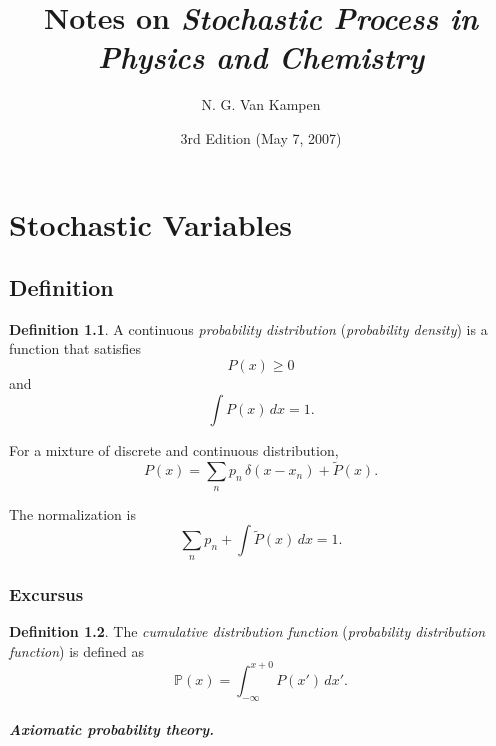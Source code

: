 \documentclass{book}
\numberwithin{equation}{section}
\theoremstyle{plain}
\theoremstyle{definition}
\newtheorem{defn}{Definition}[section]
\theoremstyle{remark}
\begin{document}
\title{Notes on \emph{Stochastic Process in Physics and Chemistry}\cite{vankampen}}
\author{N. G. Van Kampen}
\date{3rd Edition (May 7, 2007)}

\maketitle

\tableofcontents


\chapter{Stochastic Variables}

\section{Definition}

\begin{defn}
  A continuous \emph{probability distribution}
  (\emph{probability density}) is a function
  that satisfies
  \begin{equation}
    P(x) \ge 0
    \label{eq:Px_nonneg}
  \end{equation}
  and
  \begin{equation}
    \int P(x) \, dx = 1.
    \label{eq:Px_normalize}
  \end{equation}
\end{defn}

For a mixture of discrete and continuous distribution,
\begin{equation}
  P(x) = \sum_n p_n \, \delta(x - x_n) + \tilde P(x).
  \label{eq:Px_mixture}
\end{equation}

The normalization is
$$
\sum_{n} p_n + \int \tilde P(x) \, dx = 1.
$$

\subsection*{Excursus}

\begin{defn}
  The \emph{cumulative distribution function}
  (\emph{probability distribution function})
  is defined as
  \begin{equation}
    \mathbb{P}(x) = \int_{-\infty}^{x+0} P(x') \, dx'.
  \end{equation}
\end{defn}

\paragraph{Axiomatic probability theory.}
\end{document}
